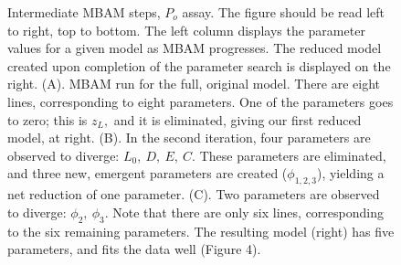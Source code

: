 \documentclass{article}
\newcommand\po{P_o}
\begin{document}
\begin{figure}
\begin{subfigure}[b]{0.6\linewidth}
{
}

\end{subfigure}

\captionsetup{width=1.3\linewidth}
\caption{Intermediate MBAM steps, $\po$ assay.  The figure should be read left to right, top to bottom.  The left column displays the parameter values for a given model as MBAM progresses.  The reduced model created upon completion of the parameter search is displayed on the right.  (A). MBAM run for the full, original model.  There are eight lines, corresponding to eight parameters.  One of the parameters goes to zero; this is $z_L,$ and it is eliminated, giving our first reduced model, at right.  (B). In the second iteration, four parameters are observed to diverge: $L_0, \ D, \ E,\ C.$  These parameters are eliminated, and three new, emergent parameters are created ($\phi_{1,2,3}$), yielding a net reduction of one parameter.  (C). Two parameters are observed to diverge: $\phi_2, \ \phi_3$.  Note that there are only six lines, corresponding to the six remaining parameters.  The resulting model (right) has five parameters, and fits the data well (Figure 4).}




\end{figure}
\end{document}
